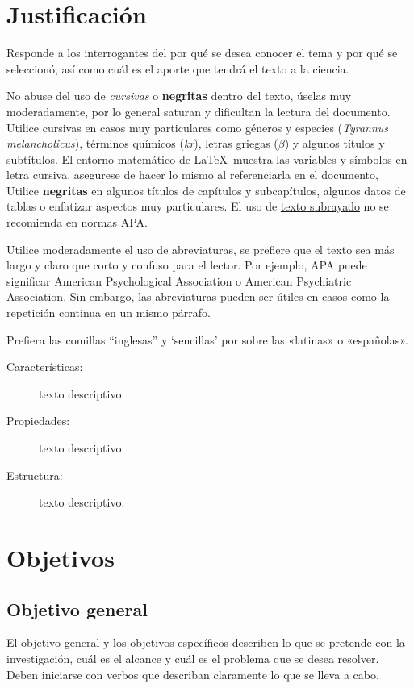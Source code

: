 \section{Justificación}

Responde a los interrogantes del por qué se desea conocer el tema y por qué se seleccionó, así como cuál es el aporte que tendrá el texto a la ciencia. 

No abuse del uso de \textit{cursivas} o \textbf{negritas} dentro del texto, úselas muy moderadamente, por lo general saturan y dificultan la lectura del documento. Utilice cursivas en casos muy particulares como géneros y especies (\textit{Tyrannus melancholicus}), términos químicos (\textit{kr}), letras griegas ($\beta$) y algunos títulos y subtítulos. El entorno matemático de \LaTeX \ muestra las variables y símbolos en letra cursiva, asegurese de hacer lo mismo al referenciarla en el documento, Utilice \textbf{negritas} en algunos títulos de capítulos y subcapítulos, algunos datos de tablas o enfatizar aspectos muy particulares. El uso de \underline{texto subrayado} no se recomienda en normas APA.

Utilice moderadamente el uso de abreviaturas, se prefiere que el texto sea más largo y claro que corto y confuso para el lector. Por ejemplo, APA puede significar American Psychological Association o American Psychiatric Association. Sin embargo, las abreviaturas pueden ser útiles en casos como la repetición continua en un mismo párrafo.

Prefiera las comillas “inglesas” y ‘sencillas’ por sobre las «latinas» o «españolas».

\begin{description}
    \item[Características:] texto descriptivo.
    \item[Propiedades:] texto descriptivo.
    \item[Estructura:] texto descriptivo.
\end{description}

\newpage
\section{Objetivos}

\subsection{Objetivo general}

El objetivo general y los objetivos específicos describen lo que se pretende con la investigación, cuál es el alcance y cuál es el problema que se desea resolver. Deben iniciarse con verbos que describan claramente lo que se lleva a cabo.

